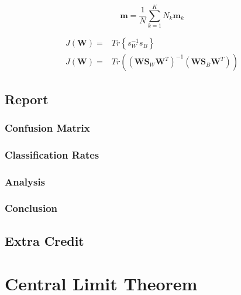 \documentclass[12pt,twoside,a4paper]{article}
\begin{document}
\begin{equation}
    \textbf{m} = \frac{1}{N}\sum_{k=1}^K N_k\textbf{m}_k
\end{equation}

\begin{align}
    J(\textbf{W}) =& Tr\left\{ s_W^{-1}s_B \right \} \\
    J(\textbf{W}) =& Tr\left( (\textbf{W}\textbf{S}_W\textbf{W}^T)^{-1} (\textbf{W}\textbf{S}_B\textbf{W}^T) \right )
\end{align}

\subsection{Report}

\subsubsection{Confusion Matrix}

\subsubsection{Classification Rates}

\subsubsection{Analysis}

\subsubsection{Conclusion}

\subsection{Extra Credit}

\pagebreak
\section{Central Limit Theorem}
\end{document}
